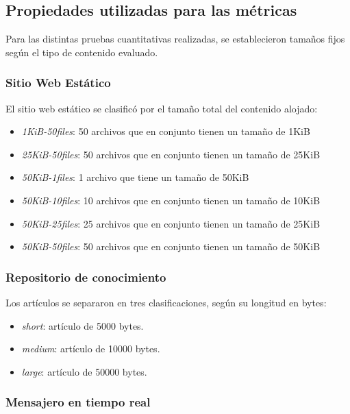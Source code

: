 \subsection{Propiedades utilizadas para las métricas}

Para las distintas pruebas cuantitativas realizadas, se establecieron tamaños fijos según el tipo de contenido evaluado.

\subsubsection{Sitio Web Estático}

El sitio web estático se clasificó por el tamaño total del contenido alojado:

\begin{itemize}
    \item \textit{1KiB-50files}: 50 archivos que en conjunto tienen un tamaño de 1KiB
    \item \textit{25KiB-50files}: 50 archivos que en conjunto tienen un tamaño de 25KiB
    \item \textit{50KiB-1files}: 1 archivo que tiene un tamaño de 50KiB
    \item \textit{50KiB-10files}: 10 archivos que en conjunto tienen un tamaño de 10KiB
    \item \textit{50KiB-25files}: 25 archivos que en conjunto tienen un tamaño de 25KiB
    \item \textit{50KiB-50files}: 50 archivos que en conjunto tienen un tamaño de 50KiB    
\end{itemize}

\subsubsection{Repositorio de conocimiento}

Los artículos se separaron en tres clasificaciones, según su longitud en bytes:

\begin{itemize}
    \item \textit{short}: artículo de 5000 bytes.
    \item \textit{medium}: artículo de 10000 bytes.
    \item \textit{large}: artículo de 50000 bytes.
\end{itemize}

\subsubsection{Mensajero en tiempo real}

